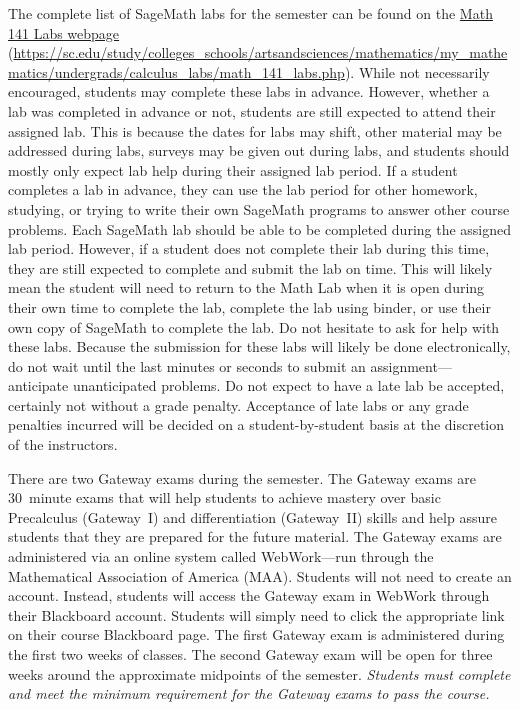 \documentclass[11pt,letterpaper]{article}
\begin{document}
The complete list of SageMath labs for the semester can be found on the \href{https://sc.edu/study/colleges\_schools/artsandsciences/mathematics/my\_mathematics/undergrads/calculus_labs/math\_141\_labs.php}{Math 141 Labs webpage} (\url{https://sc.edu/study/colleges\_schools/artsandsciences/mathematics/my\_mathematics/undergrads/calculus\_labs/math\_141\_labs.php}). While not necessarily encouraged, students may complete these labs in advance. However, whether a lab was completed in advance or not, students are still expected to attend their assigned lab. This is because the dates for labs may shift, other material may be addressed during labs, surveys may be given out during labs, and students should mostly only expect lab help during their assigned lab period. If a student completes a lab in advance, they can use the lab period for other homework, studying, or trying to write their own SageMath programs to answer other course problems. Each SageMath lab should be able to be completed during the assigned lab period. However, if a student does not complete their lab during this time, they are still expected to complete and submit the lab on time. This will likely mean the student will need to return to the Math Lab when it is open during their own time to complete the lab, complete the lab using binder, or use their own copy of SageMath to complete the lab. Do not hesitate to ask for help with these labs. Because the submission for these labs will likely be done electronically, do not wait until the last minutes or seconds to submit an assignment---anticipate unanticipated problems. Do not expect to have a late lab be accepted, certainly not without a grade penalty. Acceptance of late labs or any grade penalties incurred will be decided on a student-by-student basis at the discretion of the instructors. 
\sectionbreak




There are two Gateway exams during the semester. The Gateway exams are 30~minute exams that will help students to achieve mastery over basic Precalculus (Gateway~I) and differentiation (Gateway~II) skills and help assure students that they are prepared for the future material. The Gateway exams are administered via an online system called WebWork---run through the Mathematical Association of America (MAA). Students will not need to create an account. Instead, students will access the Gateway exam in WebWork through their Blackboard account. Students will simply need to click the appropriate link on their course Blackboard page. The first Gateway exam is administered during the first two weeks of classes. The second Gateway exam will be open for three weeks around the approximate midpoints of the semester. {\itshape Students must complete and meet the minimum requirement for the Gateway exams to pass the course.} \pspace
\end{document}
